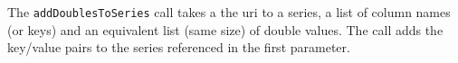 The \verb+addDoublesToSeries+ call takes a the uri to a series, a list of column names (or keys) and an equivalent
list (same size) of double values. The call adds the key/value pairs to the series referenced in the first parameter.
